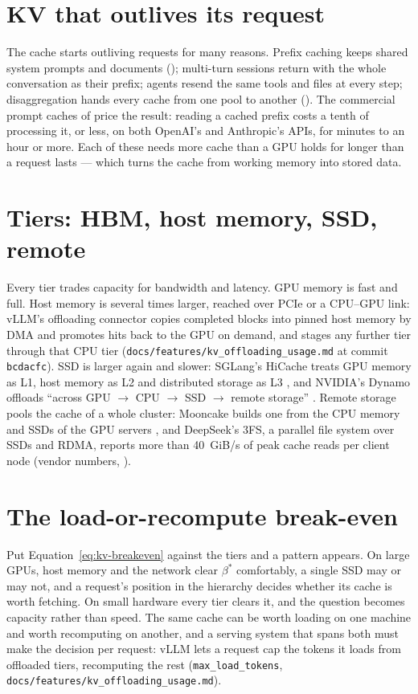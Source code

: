 \section{KV that outlives its request}

The cache starts outliving requests for many reasons. Prefix caching keeps
shared system prompts and documents (); multi-turn
sessions return with the whole conversation as their prefix; agents resend the
same tools and files at every step; disaggregation hands every cache from one
pool to another (). The commercial prompt caches of
 price the result: reading a cached prefix costs a tenth
of processing it, or less, on both OpenAI's and Anthropic's APIs, for minutes to
an hour or more.
Each of these needs more cache than a GPU holds for longer than a request
lasts --- which turns the cache from working memory into stored data.

\section{Tiers: HBM, host memory, SSD, remote}

Every tier trades capacity for bandwidth and latency. GPU memory is fast and
full. Host memory is several times larger, reached over PCIe or a CPU--GPU link:
vLLM's offloading connector copies completed blocks into pinned host memory by
DMA and promotes hits back to the GPU on demand, and stages any further tier
through that CPU tier (\texttt{docs/features/kv\_offloading\_usage.md} at commit
\texttt{bcdacfc}). SSD is larger again and slower: SGLang's HiCache treats GPU
memory as L1, host memory as L2 and distributed storage as L3
\cite{sglang2026hicache}, and NVIDIA's Dynamo offloads ``across GPU $\to$ CPU
$\to$ SSD $\to$ remote storage'' \cite{nvidia2026dynamo}. Remote storage pools
the cache of a whole cluster: Mooncake builds one from the CPU memory and SSDs
of the GPU servers \cite{qin2024mooncake}, and DeepSeek's 3FS, a parallel file
system over SSDs and RDMA, reports more than 40~GiB/s of peak cache reads per
client node (vendor numbers, \cite{deepseek2025threefs}).

\section{The load-or-recompute break-even}

Put Equation~\ref{eq:kv-breakeven} against the tiers and a pattern appears.
On large GPUs, host memory and the network clear $\beta^{*}$ comfortably, a
single SSD may or may not, and a request's position in the hierarchy decides
whether its cache is worth fetching. On small hardware every tier clears it, and
the question becomes capacity rather than speed. The same cache can be worth
loading on one machine and worth recomputing on another, and a serving system
that spans both must make the decision per request: vLLM lets a request cap the
tokens it loads from offloaded tiers, recomputing the rest
(\texttt{max\_load\_tokens}, \texttt{docs/features/kv\_offloading\_usage.md}).

